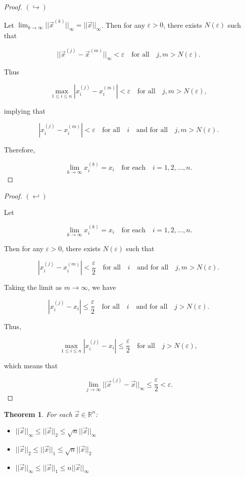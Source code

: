 \documentclass[12pt]{article}
\newcommand{\vecx}{\ensuremath{\vec{x}}}
\newtheorem{theorem}{Theorem}
\begin{document}
\begin{proof}
$(\hookrightarrow)$

Let $\displaystyle{\lim_{k\rightarrow\infty}}||\vecx^{(k)}||_\infty =
||\vecx||_\infty$. Then for any $\varepsilon > 0$, there exists
$N(\varepsilon)$ such that

\[
||\vecx^{(j)}-\vecx^{(m)}||_\infty <\varepsilon \quad
\text{for all}\quad j,m > N(\varepsilon).
\]

Thus

\[
\max_{1\leq i\leq n}|x_i^{(j)}-x_i^{(m)}| <\varepsilon\quad
\text{for all}\quad j,m > N(\varepsilon),
\]

implying that

\[
|x_i^{(j)}-x_i^{(m)}| <\varepsilon\quad \text{for all}\quad i \quad
\text{and for all}\quad j,m > N(\varepsilon).
\]

Therefore,

\[
\lim_{k\rightarrow\infty}x_i^{(k)} = x_i \quad
\text{for each} \quad i=1,2,...,n.
\]
\end{proof}
\begin{proof}
$(\hookleftarrow)$

Let

\[
\lim_{k\rightarrow\infty}x_i^{(k)} = x_i \quad
\text{for each} \quad i=1,2,...,n.
\]

Then for any $\varepsilon > 0$, there exists $N(\varepsilon)$ such that

\[
|x_i^{(j)}-x_i^{(m)}| <\frac{\varepsilon}{2}\quad
\text{for all}\quad i \quad \text{and for all}\quad j,m > N(\varepsilon).
\]

Taking the limit as $m\rightarrow\infty$, we have

\[
|x_i^{(j)}-x_i| \leq \frac{\varepsilon}{2}\quad
\text{for all}\quad i \quad \text{and for all}\quad j > N(\varepsilon).
\]

Thus,

\[
\max_{1\leq i \leq n}|x_i^{(j)}-x_i| \leq \frac{\varepsilon}{2}\quad
\text{for all}\quad j > N(\varepsilon),
\]

which means that

\[
\lim_{j\rightarrow\infty}||\vecx^{(j)}-\vecx||_\infty \leq
\frac{\varepsilon}{2} < \varepsilon.
\]
\end{proof}

\begin{theorem}
For each $\vecx \in \mathbb{R}^n$:
\begin{itemize}
\item[a.] $||\vecx||_\infty \leq ||\vecx||_2 \leq \sqrt{n}||\vecx||_\infty$
\item[b.] $||\vecx||_2 \leq ||\vecx||_1 \leq \sqrt{n}||\vecx||_2$
\item[c.] $||\vecx||_\infty \leq ||\vecx||_1 \leq n||\vecx||_\infty$
\end{itemize} 
\end{theorem}
\end{document}

